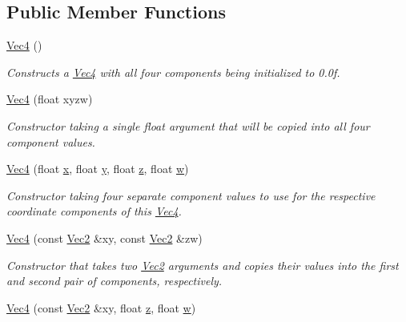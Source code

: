 \subsection*{Public Member Functions}
\begin{DoxyCompactItemize}
\item 
\hyperlink{classgfxmath_1_1_vec4_a86e3b18e88af7f0d85629b01da04f2e9}{Vec4} ()
\begin{DoxyCompactList}\small\item\em Constructs a \hyperlink{classgfxmath_1_1_vec4}{Vec4} with all four components being initialized to 0.\+0f. \end{DoxyCompactList}\item 
\hyperlink{classgfxmath_1_1_vec4_a6ab39b817f6eeac365ee31ddf76635f9}{Vec4} (float xyzw)
\begin{DoxyCompactList}\small\item\em Constructor taking a single float argument that will be copied into all four component values. \end{DoxyCompactList}\item 
\hyperlink{classgfxmath_1_1_vec4_a77430bab02f56509bb3455863972ad8a}{Vec4} (float \hyperlink{classgfxmath_1_1_vec4_a273598aff75406f0e7a47121b8b06037}{x}, float \hyperlink{classgfxmath_1_1_vec4_a95e0ca27d66d7e0223606c20d326b595}{y}, float \hyperlink{classgfxmath_1_1_vec4_acd626b757468a5ea39f98812a36c4419}{z}, float \hyperlink{classgfxmath_1_1_vec4_adf2769a47b464dfee8d04e191f21701e}{w})
\begin{DoxyCompactList}\small\item\em Constructor taking four separate component values to use for the respective coordinate components of this \hyperlink{classgfxmath_1_1_vec4}{Vec4}. \end{DoxyCompactList}\item 
\hyperlink{classgfxmath_1_1_vec4_a426ca21da0ff954f7aded1982166f549}{Vec4} (const \hyperlink{classgfxmath_1_1_vec2}{Vec2} \&xy, const \hyperlink{classgfxmath_1_1_vec2}{Vec2} \&zw)
\begin{DoxyCompactList}\small\item\em Constructor that takes two \hyperlink{classgfxmath_1_1_vec2}{Vec2} arguments and copies their values into the first and second pair of components, respectively. \end{DoxyCompactList}\item 
\hyperlink{classgfxmath_1_1_vec4_af296766fa56d041e2478646f1ee9b081}{Vec4} (const \hyperlink{classgfxmath_1_1_vec2}{Vec2} \&xy, float \hyperlink{classgfxmath_1_1_vec4_acd626b757468a5ea39f98812a36c4419}{z}, float \hyperlink{classgfxmath_1_1_vec4_adf2769a47b464dfee8d04e191f21701e}{w})

\end{DoxyCompactItemize}
